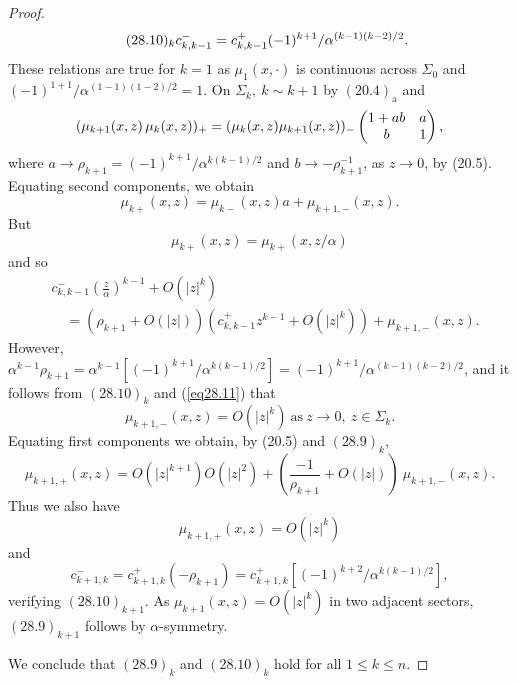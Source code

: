 \documentclass{surv-l}
\theoremstyle{plain}
\theoremstyle{definition}
\numberwithin{equation}{chapter}
\begin{document}
\begin{proof}
\begin{align*}\tag*{$(28.10)_{k}$}
& c_{k,k-1}^{-}=c_{k,k-1}^{+}(-1)^{k+1}/\alpha^{(k-1)(k-2)/2}.
\end{align*}
These relations are true for $k=1$ as $\mu_{1}(x, \cdot)$ is continuous across $\Sigma_{0}$ and $(-1)^{1+1}/\alpha^{(1-1)(1-2)/2}=1$. On $\Sigma_{k},\ k\sim k+1$ by $(20.4)_{\mathrm{a}}$ and
\begin{equation*}
(\mu_{k+1}(x, z)\,\mu_{k}(x,z))_{+}=(\mu_{k}
(x, z)\mu_{k+1}(x, z))_{-}\left(\begin{array}{@{}cc@{}}
1+ab & a\\
b  &1
\end{array}\right),
\end{equation*}
where $a\rightarrow\rho_{k+1}=(-1)^{k+1}/\alpha^{k(k-1)/2}$ and $b\rightarrow-\rho_{k+1}^{-1}$, as $z\rightarrow 0$, by (20.5).
 Equating second components, we obtain
\begin{equation*}
\mu_{k+} (x, z) =\mu_{k-}(x,z)a+\mu_{k+1,-}(x,z).
\end{equation*}
But
\begin{equation*}
\mu_{k+}(x, z)=\mu_{k+}(x, z/\alpha)
\end{equation*}
and so
\setcounter{equation}{10}
\begin{align}\label{eq28.11}
&c_{k,k-1}^{-}\left(\frac{z}{\alpha}\right)^{k-1}+O(|z|^{k})\\
&\quad=(\rho_{k+1}+O(|z|))(c_{k
,k-1}^{+}z^{k-1}+O(|z|^{k}))+\mu_{k+1,-}(x,z).\nonumber
\end{align}
However, $\alpha^{k-1}\rho_{k+1}=\alpha^{k-1}[(-1)^{k+1}/\alpha^{k(k-1)/2}]=(-1)^{k+1}/\alpha^{(k-1)(k-2)/2}$, and it follows from $(28.10)_{k}$ and (\ref{eq28.11}) that
\begin{equation}\label{eq28.12}
\mu_{k+1,-}(x,z)=O(|z|^{k})\ \mathrm{as}\ z\rightarrow 0,\ z\in\Sigma_{k}.
\end{equation}
Equating first components we obtain, by (20.5) and $(28.9)_{k}$,
\begin{equation*}
\mu_{k+1,+}(x,z) = O(|z|^{k+1})O(|z|^{2})+\left(\frac{-1}{\rho_{k+1}}+O(|z|)\right)\ \mu_{k+1,-}(x, z).
\end{equation*}
Thus we also have
\begin{equation*}
\mu_{k+1,+}(x,z)=O(|z|^{k})
\end{equation*}
and
\begin{equation*}
c_{k+1,k}^{-}=c_{k+1,k}^{+}(-\rho_{k+1})=c_{k+1,k}^{+}[(-1)^{k+2}/\alpha^{k(k-1)/2}],
\end{equation*}
verifying $(28.10)_{k+1}$. As $\mu_{k+1}(x,z)=O(|z|^{k})$ in two adjacent sectors, $(28.9)_{k+1}$ follows by $\alpha$-symmetry.

We conclude that $(28.9)_{k}$ and $(28.10)_{k}$ hold for all $1\leq k\leq n.$
\end{proof}
\end{document}
